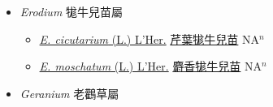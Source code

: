 
  \begin{itemize}
 \item[] \textit{Erodium} 牻牛兒苗屬
                    
  \begin{itemize}
        \item[] \href{http://www.theplantlist.org/tpl1.1/search?q=Erodium+cicutarium}{\textit{E. cicutarium} (L.) L'Her.}   \href{\detokenize{http://taibnet.sinica.edu.tw/chi/taibnet_species_list.php?T2=芹葉牻牛兒苗&T2_new_value=true&fr=y}}{芹葉牻牛兒苗} NA$^n$
        \item[] \href{http://www.theplantlist.org/tpl1.1/search?q=Erodium+moschatum}{\textit{E. moschatum} (L.) L'Her.}   \href{\detokenize{http://taibnet.sinica.edu.tw/chi/taibnet_species_list.php?T2=麝香牻牛兒苗&T2_new_value=true&fr=y}}{麝香牻牛兒苗} NA$^n$
  \end{itemize}
 \item[] \textit{Geranium} 老鸛草屬
                    

\end{itemize}
